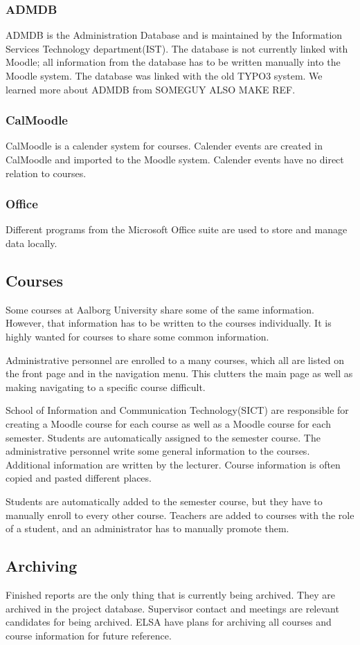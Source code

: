 \subsubsection*{ADMDB}
ADMDB is the Administration Database and is maintained by the Information Services Technology department(IST).
The database is not currently linked with Moodle; all information from the database has to be written manually into the Moodle system.
The database was linked with the old TYPO3 system.
We learned more about ADMDB from SOMEGUY ALSO MAKE REF. 

\subsubsection*{CalMoodle}
CalMoodle is a calender system for courses.
Calender events are created in CalMoodle and imported to the Moodle system.
Calender events have no direct relation to courses.

\subsubsection*{Office}
Different programs from the Microsoft Office suite are used to store and manage data locally.




\subsection*{Courses}
Some courses at Aalborg University share some of the same information.
However, that information has to be written to the courses individually.
It is highly wanted for courses to share some common information.

Administrative personnel are enrolled to a many courses, which all are listed on the front page and in the navigation menu.
This clutters the main page as well as making navigating to a specific course difficult.

School of Information and Communication Technology(SICT) are responsible for creating a Moodle course for each course as well as a Moodle course for each semester. 
Students are automatically assigned to the semester course.
The administrative personnel write some general information to the courses.
Additional information are written by the lecturer.
Course information is often copied and pasted different places.

Students are automatically added to the semester course, but they have to manually enroll to every other course.
Teachers are added to courses with the role of a student, and an administrator has to manually promote them.




\subsection*{Archiving}
Finished reports are the only thing that is currently being archived.
They are archived in the project database.
Supervisor contact and meetings are relevant candidates for being archived.
ELSA have plans for archiving all courses and course information for future reference.